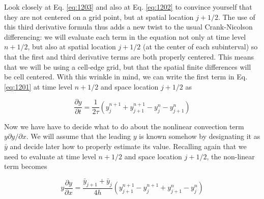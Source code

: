 Look closely at Eq. \ref{eq:1203} and also at Eq. \ref{eq:1202} to convince yourself that they are not centered on a grid point, but at spatial location $j+1 / 2$. The use of this third derivative formula thus adds a new twist to the usual Crank-Nicolson differencing: we will evaluate each term in the equation not only at time level $n+1 / 2$, but also at spatial location $j+1 / 2$ (at the center of each subinterval) so that the first and third derivative terms are both properly centered. This means that we will be using a cell-edge grid, but that the spatial finite differences will be cell centered.
With this wrinkle in mind, we can write the first term in Eq. \ref{eq:1201} at time level $n+1 / 2$ and space location $j+1 / 2$ as

\begin{equation}\label{eq:1204}
\frac{\partial y}{\partial t}=\frac{1}{2 \tau}\left(y_{j}^{n+1}+y_{j+1}^{n+1}-y_{j}^{n}-y_{j+1}^{n}\right)
\end{equation}

Now we have have to decide what to do about the nonlinear convection term $y \partial y / \partial x$. We will assume that the leading $y$ is known somehow by designating it as $\bar{y}$ and decide later how to properly estimate its value. Recalling again that we need to evaluate at time level $n+1 / 2$ and space location $j+1 / 2$, the non-linear term becomes

\begin{equation}\label{eq:1205}
y \frac{\partial y}{\partial x}=\frac{\bar{y}_{j+1}+\bar{y}_{j}}{4 h}\left(y_{j+1}^{n+1}-y_{j}^{n+1}+y_{j+1}^{n}-y_{j}^{n}\right)
\end{equation}

